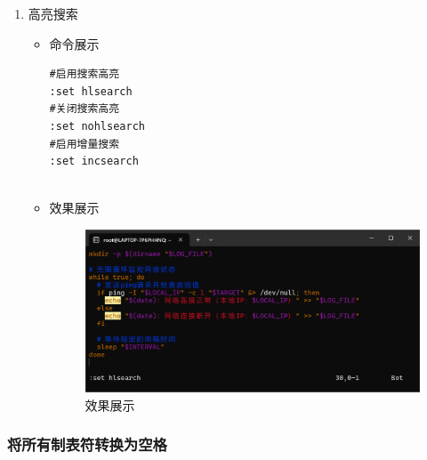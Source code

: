 \documentclass[UTF8]{ctexart}
\begin{document}
\begin{enumerate}
  \item 高亮搜索
  \begin{itemize}
  \item 命令展示
  \begin{verbatim}
#启用搜索高亮
:set hlsearch
#关闭搜索高亮
:set nohlsearch 
#启用增量搜索
:set incsearch 
    
  \end{verbatim}

  \item 效果展示
  \begin{figure}[H]
    \centering
    \includegraphics[width=\textwidth]{25} %
    \caption{效果展示}
  
  \end{figure}
\end{itemize}
\end{enumerate}
\subsubsection{将所有制表符转换为空格}
\end{document}
